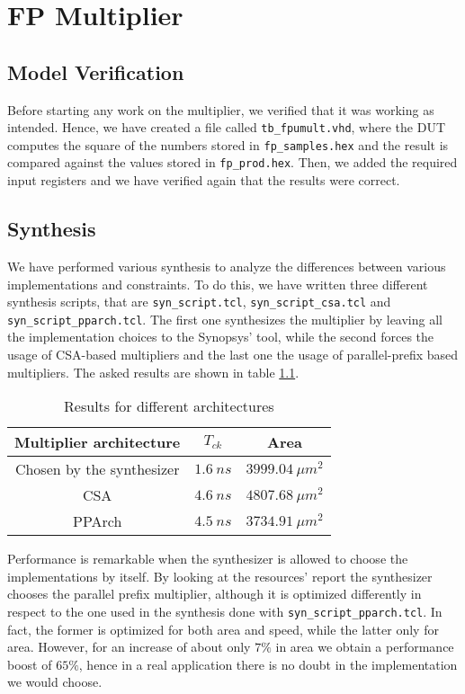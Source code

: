 \chapter{FP Multiplier}

\section{Model Verification}

Before starting any work on the multiplier, we verified that it was working as intended.
Hence, we have created a file called \verb|tb_fpumult.vhd|, where the DUT computes the
square of the numbers stored in \verb|fp_samples.hex| and the result is compared against the
values stored in \verb|fp_prod.hex|.
Then, we added the required input registers and we have verified again that the results were correct.

\section{Synthesis}

We have performed various synthesis to analyze the differences between various implementations and constraints.
To do this, we have written three different synthesis scripts, that are \verb|syn_script.tcl|, \verb|syn_script_csa.tcl|
and \verb|syn_script_pparch.tcl|. The first one synthesizes the multiplier by leaving all the implementation choices to
the Synopsys' tool, while the second forces the usage of CSA-based multipliers and the last one the usage of parallel-prefix based
multipliers. The asked results are shown in table \ref{tab:ex1}.

\begin{table}[!ht]
    \centering
    \begin{tabular}{ |c|c|c| }
        \hline
        Multiplier architecture & $T_{ck}$ & Area \\
        \hline
        Chosen by the synthesizer & $1.6\ ns$ & $3999.04\ \mu m^2$ \\
        \hline
        CSA & $4.6\ ns$ & $4807.68\ \mu m^2$ \\
        \hline
        PPArch & $4.5\ ns$ & $3734.91\ \mu m^2$ \\
        \hline
    \end{tabular}
    \caption{Results for different architectures}
    \label{tab:ex1}
\end{table}

Performance is remarkable when the synthesizer is allowed to choose the implementations by itself. By looking at
the resources' report the synthesizer chooses the parallel prefix multiplier, although it is optimized differently
in respect to the one used in the synthesis done with \verb|syn_script_pparch.tcl|. In fact, the former is optimized
for both area and speed, while the latter only for area. However, for an increase of about only $7\%$ in area we obtain
a performance boost of $65\%$, hence in a real application there is no doubt in the implementation we would choose.

